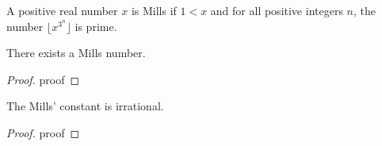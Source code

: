 %

\begin{definition}
    \label{def:mills}
    A positive real number $x$ is Mills if $1 < x$ and
    for all positive integers $n$, the number $\lfloor x^{3^n} \rfloor$ is prime.
\end{definition}

\begin{proposition}
    \label{prop:mills}
    There exists a Mills number.
\end{proposition}

\begin{proof}
    proof
\end{proof}

\begin{theorem}
    \label{thm:mills_irrational}
    The Mills' constant is irrational.    
\end{theorem}

\begin{proof}
    proof
\end{proof}